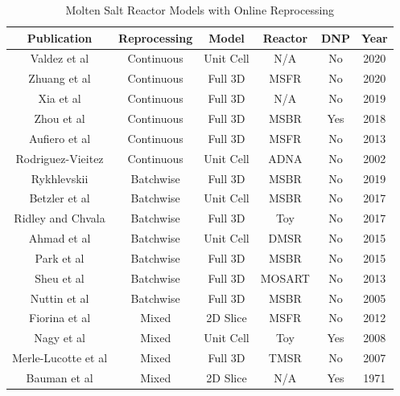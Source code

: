 \begin{table}[H]
\renewcommand{\arraystretch}{1.25}
\caption{Molten Salt Reactor Models with Online Reprocessing}
\label{tab:codes_types}
\begin{center}
\begin{tabular}{  c | c | c | c | c | c}
 \hline
 Publication & Reprocessing & Model & Reactor & DNP & Year\\
 \hline
 \hline
 Valdez et al \cite{jr_vicente_valdez_modeling_2020} & Continuous & Unit Cell & N/A & No & 2020\\
 Zhuang et al \cite{zhuang_extended_2020} & Continuous & Full 3D & MSFR & No & 2020\\
 Xia et al \cite{xia_development_2019} & Continuous & Full 3D & N/A & No & 2019\\
 Zhou et al \cite{zhou_fuel_2018} & Continuous & Full 3D & MSBR & Yes & 2018\\
 Aufiero et al \cite{aufiero_extended_2013} & Continuous & Full 3D & MSFR & No & 2013\\
 Rodriguez-Vieitez \cite{rodriguez-vieitez_transmutation_2002} & Continuous & Unit Cell & ADNA & No & 2002\\
 \hline
 
 Rykhlevskii \cite{rykhlevskii_modeling_2019} & Batchwise & Full 3D & MSBR & No & 2019\\
 Betzler et al \cite{betzler_molten_2017} & Batchwise & Unit Cell & MSBR & No & 2017\\
 Ridley and Chvala \cite{ridley_method_2017} & Batchwise & Full 3D & Toy & No & 2017\\
 Ahmad et al \cite{ahmad_neutronics_2015} & Batchwise & Unit Cell & DMSR & No & 2015\\
 Park et al \cite{park_whole_2015} & Batchwise & Full 3D & MSBR & No & 2015\\
 Sheu et al \cite{sheu_depletion_2013} & Batchwise & Full 3D & MOSART & No & 2013\\
 Nuttin et al \cite{nuttin_potential_2005} & Batchwise & Full 3D & MSBR & No & 2005\\
 
 \hline
 Fiorina et al \cite{fiorina_preliminary_2012} & Mixed & 2D Slice & MSFR & No & 2012\\
 Nagy et al \cite{nagy_parametric_2008} & Mixed & Unit Cell & Toy & Yes & 2008\\
 Merle-Lucotte et al \cite{merle-lucotte_thorium_2007} & Mixed & Full 3D & TMSR & No & 2007\\
 Bauman et al \cite{h_f_bauman_rod_1971} & Mixed & 2D Slice & N/A & Yes & 1971\\
 
 \hline
\end{tabular}
\end{center}
\end{table}

